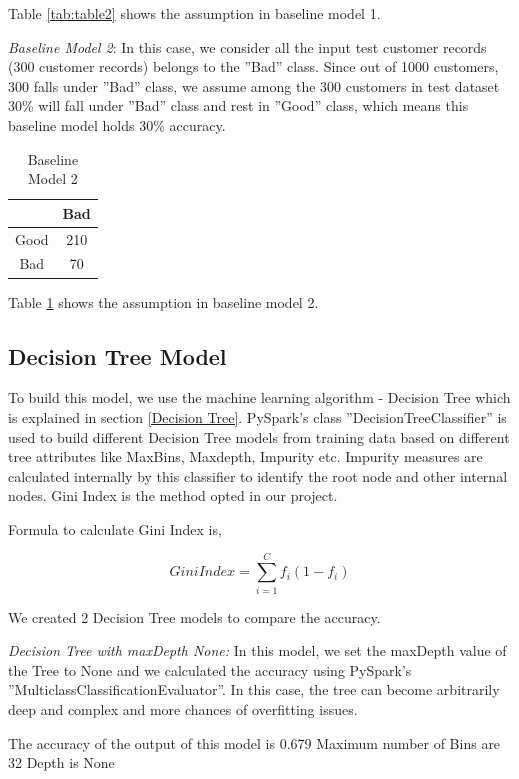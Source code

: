 \documentclass[sigconf]{acmart}
\begin{document}
Table \ref{tab:table2} shows the assumption in baseline model 1.

\textit{Baseline Model 2}: In this case, we consider all the input test customer records (300 customer records) belongs to the ''Bad'' class. Since out of 1000 customers, 300 falls under ''Bad'' class, we assume among the 300 customers in test dataset 30\% will fall under ''Bad'' class and rest in ''Good'' class, which means this baseline model holds 30\% accuracy. 

\begin{table}
  \caption{Baseline Model 2}
  \label{tab:table3}
  \begin{tabular}{cc}
    \toprule
     & Bad\\
    \midrule
    Good& 210\\
    Bad& 70\\
    \bottomrule
  \end{tabular}
\end{table}

Table \ref{tab:table3} shows the assumption in baseline model 2.

\subsection{Decision Tree Model}

To build this model, we use the machine learning algorithm - Decision Tree which is explained in section \ref{Decision Tree}. PySpark's class ''DecisionTreeClassifier'' is used to build different Decision Tree models from training data based on different tree attributes like MaxBins, Maxdepth, Impurity etc. Impurity measures are calculated internally by this classifier to identify the root node and other internal nodes. Gini Index is the method opted in our project.

Formula to calculate Gini Index is,

\begin{equation}
Gini Index = \sum_{i=1}^Cf_i(1-{f_i})
\end{equation}

We created 2 Decision Tree models to compare the accuracy.

\textit{Decision Tree with maxDepth None:} In this model, we set the maxDepth value of the Tree to None and we calculated the accuracy using PySpark's ''MulticlassClassificationEvaluator''. In this case, the tree can become arbitrarily deep and complex and more chances of overfitting issues.

The accuracy of the output of this model is 0.679
Maximum number of Bins are 32
Depth is None
\end{document}
